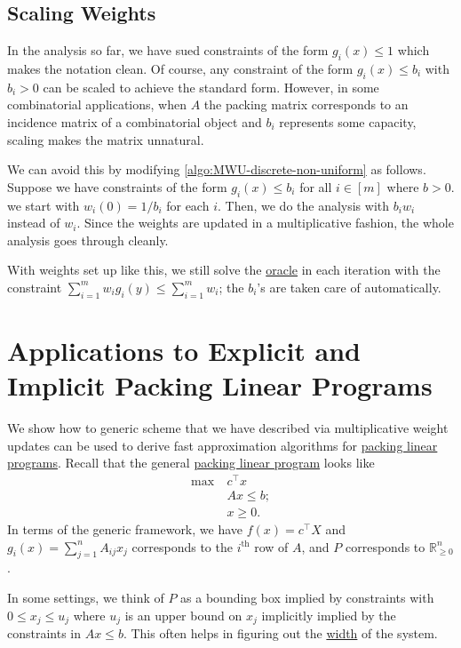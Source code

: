 \subsection{Scaling Weights}
In the analysis so far, we have sued constraints of the form \(g_i(x) \leq 1\) which makes the notation clean. Of course, any constraint of the form \(g_i(x) \leq b_i\) with \(b_i > 0\) can be scaled to achieve the standard form. However, in some combinatorial applications, when \(A\) the packing matrix corresponds to an incidence matrix of a combinatorial object and \(b_i\) represents some capacity, scaling makes the matrix unnatural.

We can avoid this by modifying \autoref{algo:MWU-discrete-non-uniform} as follows. Suppose we have constraints of the form \(g_i(x) \leq b_i\) for all \(i \in [m]\) where \(b > 0\). we start with \(w_i(0) = 1 / b_i\) for each \(i\). Then, we do the analysis with \(b_i w_i\) instead of \(w_i\). Since the weights are updated in a multiplicative fashion, the whole analysis goes through cleanly.

\begin{note}
	With weights set up like this, we still solve the \hyperref[eq:MWU-oracle]{oracle} in each iteration with the constraint \(\sum_{i=1}^{m} w_i g_i(y) \leq \sum_{i=1}^{m} w_i\); the \(b_i\)'s are taken care of automatically.
\end{note}

\section{Applications to Explicit and Implicit Packing Linear Programs}
We show how to generic scheme that we have described via multiplicative weight updates can be used to derive fast approximation algorithms for \hyperref[def:packing-LP]{packing linear programs}. Recall that the general \hyperref[def:packing-LP]{packing linear program} looks like
\[
	\begin{aligned}
		\max~ & c^{\top} x  \\
		      & Ax \leq b ; \\
		      & x \geq 0.
	\end{aligned}
\]
In terms of the generic framework, we have \(f(x) = c^{\top} X\) and \(g_i(x) = \sum_{j=1}^{n} A_{ij} x_j\) corresponds to the \(i^{\text{th} }\) row of \(A\), and \(P\) corresponds to \(\mathbb{R} _{\geq 0}^n\).

\begin{note}
	In some settings, we think of \(P\) as a bounding box implied by constraints with \(0 \leq x_j \leq u_j\) where \(u_j\) is an upper bound on \(x_j\) implicitly implied by the constraints in \(Ax \leq b\). This often helps in figuring out the \hyperref[def:width]{width} of the system.
\end{note}

